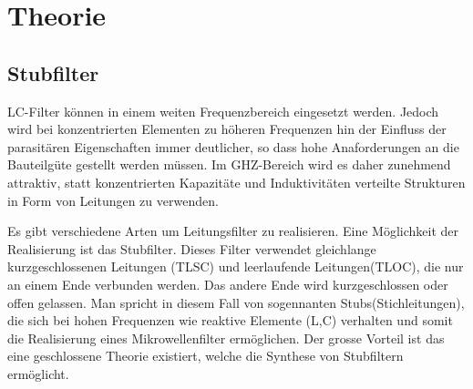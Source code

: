 \section{Theorie}


\subsection{Stubfilter}

LC-Filter können in einem weiten Frequenzbereich eingesetzt werden. Jedoch wird bei konzentrierten Elementen zu höheren Frequenzen hin der Einfluss der parasitären Eigenschaften immer deutlicher, so dass hohe Anaforderungen an die Bauteilgüte gestellt werden müssen. Im GHZ-Bereich wird es daher zunehmend attraktiv, statt konzentrierten Kapazitäte und Induktivitäten verteilte Strukturen in Form von Leitungen zu verwenden.

Es gibt verschiedene Arten um Leitungsfilter zu realisieren. Eine Möglichkeit der Realisierung ist das Stubfilter. Dieses Filter verwendet gleichlange kurzgeschlossenen Leitungen (TLSC) und leerlaufende Leitungen(TLOC), die nur an einem Ende verbunden werden. Das andere Ende wird kurzgeschlossen oder offen gelassen. Man spricht in diesem Fall von sogennanten Stubs(Stichleitungen), die sich bei hohen Frequenzen wie reaktive Elemente (L,C) verhalten und somit die  Realisierung eines Mikrowellenfilter ermöglichen. Der grosse Vorteil ist das eine geschlossene Theorie existiert, welche die Synthese von Stubfiltern ermöglicht.


